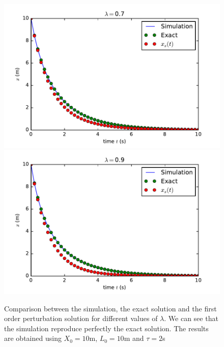 \documentclass[a4paper,10pt]{article}
\begin{document}
\begin{figure}[!hp]
\hspace*{-2.1cm}\includegraphics[width=4.5in]{Simus_lambda=07.pdf}\hspace*{-1.1cm}\includegraphics[width=4.5in]{Simus_lambda=09.pdf}
\caption{Comparison between the simulation, the exact solution and the first order perturbation solution for different values of $\lambda$. We can see that the simulation reproduce perfectly the exact solution. The results are obtained using $X_0=10$m, $L_0=10$m and $\tau=2$s }
\label{default}
\end{figure}
\end{document}
